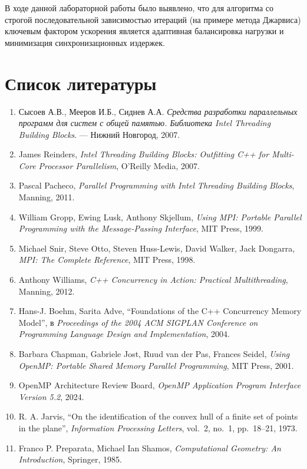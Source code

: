 \documentclass[12pt,a4paper]{article}
\begin{document}
В ходе данной лабораторной работы было выявлено, что для алгоритма со строгой последовательной зависимостью итераций (на примере метода Джарвиса) ключевым фактором ускорения является адаптивная балансировка нагрузки и минимизация синхронизационных издержек.
\newpage
\section*{Список литературы}

\begin{enumerate}
    \item Сысоев А.В., Мееров И.Б., Сиднев А.А. \textit{Средства разработки параллельных программ для систем с общей памятью. Библиотека Intel Threading Building Blocks}. — Нижний Новгород, 2007.
  \item James Reinders, \emph{Intel Threading Building Blocks: Outfitting C++ for Multi-Core Processor Parallelism}, O’Reilly Media, 2007.
  \item Pascal Pacheco, \emph{Parallel Programming with Intel Threading Building Blocks}, Manning, 2011.
  \item William Gropp, Ewing Lusk, Anthony Skjellum, \emph{Using MPI: Portable Parallel Programming with the Message-Passing Interface}, MIT Press, 1999.
  \item Michael Snir, Steve Otto, Steven Huss-Lewis, David Walker, Jack Dongarra, \emph{MPI: The Complete Reference}, MIT Press, 1998.
  \item Anthony Williams, \emph{C++ Concurrency in Action: Practical Multithreading}, Manning, 2012.
  \item Hans-J. Boehm, Sarita Adve, “Foundations of the C++ Concurrency Memory Model”, в \emph{Proceedings of the 2004 ACM SIGPLAN Conference on Programming Language Design and Implementation}, 2004.
  \item Barbara Chapman, Gabriele Jost, Ruud van der Pas, Frances Seidel, \emph{Using OpenMP: Portable Shared Memory Parallel Programming}, MIT Press, 2001.
  \item OpenMP Architecture Review Board, \emph{OpenMP Application Program Interface Version 5.2}, 2024.
  \item R. A. Jarvis, “On the identification of the convex hull of a finite set of points in the plane”, \emph{Information Processing Letters}, vol.~2, no.~1, pp.~18–21, 1973.
  \item Franco P. Preparata, Michael Ian Shamos, \emph{Computational Geometry: An Introduction}, Springer, 1985.
\end{enumerate}
\newpage
\end{document}
